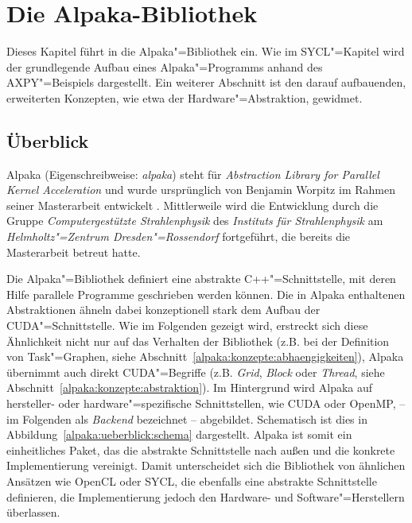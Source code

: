 \chapter{Die Alpaka-Bibliothek}\label{alpaka}

Dieses Kapitel führt in die Alpaka"=Bibliothek ein. Wie im SYCL"=Kapitel wird
der grundlegende Aufbau eines Alpaka"=Programms anhand des AXPY"=Beispiels
dargestellt. Ein weiterer Abschnitt ist den darauf aufbauenden, erweiterten
Konzepten, wie etwa der Hardware"=Abstraktion, gewidmet.

\section{Überblick}\label{alpaka:ueberblick}

Alpaka (Eigenschreibweise: \textit{alpaka}) steht für
\textit{Abstraction Library for Parallel Kernel Acceleration} und wurde
ursprünglich von Benjamin Worpitz im Rahmen seiner Masterarbeit entwickelt
\cite[vgl.][]{worpitz2015}. Mittlerweile wird die Entwicklung durch
die Gruppe \textit{Computergestützte Strahlenphysik} des
\textit{Instituts für Strahlenphysik} am
\textit{Helmholtz"=Zentrum Dresden"=Rossendorf} fortgeführt, die bereits die
Masterarbeit betreut hatte.

Die Alpaka"=Bibliothek definiert eine abstrakte C++"=Schnittstelle, mit deren
Hilfe parallele Programme geschrieben werden können. Die in Alpaka enthaltenen
Abstraktionen ähneln dabei konzeptionell stark dem Aufbau der
CUDA"=Schnittstelle. Wie im Folgenden gezeigt wird, erstreckt sich diese
Ähnlichkeit nicht nur auf das Verhalten der Bibliothek (z.B. bei der Definition
von Task"=Graphen, siehe Abschnitt~\ref{alpaka:konzepte:abhaengigkeiten}),
Alpaka übernimmt auch direkt CUDA"=Begriffe (z.B. \textit{Grid}, \textit{Block}
oder \textit{Thread}, siehe  Abschnitt~\ref{alpaka:konzepte:abstraktion}). Im
Hintergrund wird Alpaka auf hersteller- oder hardware"=spezifische
Schnittstellen, wie CUDA oder OpenMP, -- im Folgenden als \textit{Backend}
bezeichnet -- abgebildet. Schematisch ist dies in
Abbildung~\ref{alpaka:ueberblick:schema} dargestellt. Alpaka ist somit ein
einheitliches Paket, das die abstrakte Schnittstelle nach außen und die konkrete
Implementierung vereinigt. Damit unterscheidet sich die Bibliothek von ähnlichen
Ansätzen wie OpenCL oder SYCL, die ebenfalls eine abstrakte Schnittstelle
definieren, die Implementierung jedoch den Hardware- und Software"=Herstellern
überlassen.


